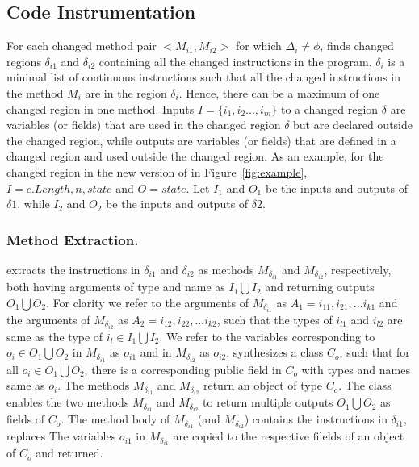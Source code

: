 \subsection{Code Instrumentation}
For each changed method pair $<$$M_{i1}, M_{i2}$$>$ for which $\Delta_i \neq \phi$,  finds changed regions $\delta_{i1}$ and $\delta_{i2}$ containing all the changed instructions in the program. $\delta_i$ is a minimal list of continuous instructions such that all the changed instructions in the method $M_i$ are in the region $\delta_i$. Hence, there can be a maximum of one changed region in one method.
Inputs $I = \{i_1, i_2...,i_m\}$ to a changed region $\delta$ are variables (or fields) that are used 
in the changed region $\delta$ but are declared outside the changed region, 
while outputs are variables (or fields) that are defined in a changed region and used outside the changed region.
As an example, for the changed region in the new version of  in Figure~\ref{fig:example}, $I = {c.Length, n, state}$ and $O = {state}$.
Let $I_1$ and $O_1$ be the inputs and outputs of $\delta1$, while $I_2$ and $O_2$ be the inputs and outputs of $\delta2$.

\subsubsection{Method Extraction.}
 extracts the instructions in $\delta_{i1}$ and $\delta_{i2}$ as methods $M_{\delta_{i1}}$ and 
$M_{\delta_{i2}}$, respectively, both having arguments of type and name as $I_1 \bigcup I_2$ and returning outputs 
$O_1 \bigcup O_2$.
For clarity we refer to the arguments of $M_{\delta_{i1}}$ as $A_{1} = {i_{11}, i_{21},...i_{k1}}$ and the arguments of 
$M_{\delta_{i2}}$ as $A_{2} = {i_{12}, i_{22},...i_{k2}}$, such that the types of $i_{l1}$ and $i_{l2}$
are same as the type of $i_l \in I_1 \bigcup I_2$.
We refer to the variables corresponding to $o_i \in O_1 \bigcup O_2$ in $M_{\delta_{i1}}$ as $o_{i1}$ and in 
$M_{\delta_{i2}}$ as $o_{i2}$.
 synthesizes a class $C_o$, such that 
for all $o_i \in O_1 \bigcup O_2$, there is a corresponding public field in $C_o$ with 
types and names same as $o_i$.
The methods $M_{\delta_{i1}}$ and $M_{\delta_{i2}}$ return an object of type $C_o$.
The class enables the two methods $M_{\delta_{i1}}$ and $M_{\delta_{i2}}$
to return multiple outputs $O_1 \bigcup O_2$ as fields of $C_o$.
The method body of $M_{\delta_{i1}}$ (and $M_{\delta_{i2}}$)
contains the instructions in $\delta_{i1}$, replaces 
The variables $o_{i1}$ in $M_{\delta_{i1}}$ are copied to the respective filelds of an object of $C_o$ and returned.


